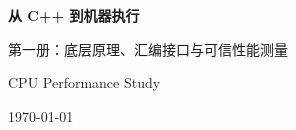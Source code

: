 \begin{titlepage}
  \centering
  \vspace*{3cm}

  {\bfseries 从 C++ 到机器执行\par}
  \vspace{1.2cm}
  { 第一册：底层原理、汇编接口与可信性能测量\par}
  \vspace{2cm}
  { CPU Performance Study\par}
  \vfill
  {\large \today\par}
\end{titlepage}
